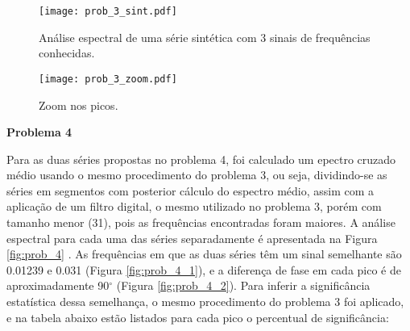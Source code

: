 \documentclass[12pt,portuguese,a4paper,pdftex]{article}
\renewcommand{\baselinestretch}{1.5}
\begin{document}
\vspace{-0.5cm}

\begin{figure}[ht]
\begin{center}
\texttt{[image: prob\_3\_sint.pdf]}
\end{center}
\vspace{-0.5cm}
\renewcommand{\baselinestretch}{.5}
\caption{\label{fig:prob_3_sint} \small{Análise espectral de uma série sintética com 3 sinais de frequências conhecidas.}}
\end{figure}

\vspace{-0.5cm}

\begin{figure}[ht]
\begin{center}
\texttt{[image: prob\_3\_zoom.pdf]}
\end{center}
\vspace{-0.5cm}
\renewcommand{\baselinestretch}{.5}
\caption{\label{fig:prob_3_zoom} \small{Zoom nos picos.}}
\end{figure}

{\bf Problema 4}

Para as duas séries propostas no problema 4, foi calculado um epectro cruzado médio usando o mesmo procedimento do problema 3, ou seja, dividindo-se as séries em segmentos com posterior cálculo do espectro médio, assim com a aplicação de um filtro digital, o mesmo utilizado no problema 3, porém com tamanho menor (31), pois as frequências encontradas foram maiores. A análise espectral para cada uma das séries separadamente é apresentada na Figura \ref{fig:prob_4} . As frequências em que as duas séries têm um sinal semelhante são 0.01239 e 0.031 (Figura \ref{fig:prob_4_1}), e a diferença de fase em cada pico é de aproximadamente 90$^\circ$ (Figura \ref{fig:prob_4_2}). Para inferir a significância estatística dessa semelhança, o mesmo procedimento do problema 3 foi aplicado, e na tabela abaixo estão listados para cada pico o percentual de significância:
\end{document}
